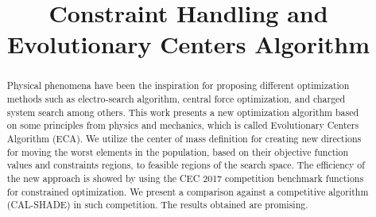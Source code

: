 \documentclass[conference]{IEEEtran}
\begin{document}
\title{Constraint Handling and Evolutionary Centers Algorithm\\
}


\author{
\and
{}
}

\maketitle

\begin{abstract}
Physical phenomena have been the inspiration for proposing different
optimization methods such as electro-search algorithm, central force 
optimization, and charged system search among others. This work presents a new 
optimization algorithm based on some principles from physics and
mechanics, which is called Evolutionary Centers Algorithm (ECA). We utilize 
the center of mass definition for creating new directions for moving the worst 
elements in the population,  based on their objective function values and constraints regions, to feasible regions of the search space.  The efficiency of the new approach is showed by using the CEC 2017 competition benchmark functions for constrained optimization. We present a comparison against a competitive algorithm (CAL-SHADE) 
in such competition.  The results obtained are promising.
\end{abstract}
\end{document}
